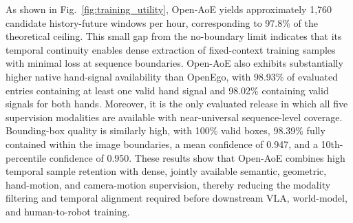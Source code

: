 As shown in Fig.~\ref{fig:training_utility}, Open-AoE yields approximately 1,760 candidate history-future windows per hour, corresponding to 97.8\% of the theoretical ceiling. %
This small gap from the no-boundary limit indicates that its temporal continuity enables dense extraction of fixed-context training samples with minimal loss at sequence boundaries. %
Open-AoE also exhibits substantially higher native hand-signal availability than OpenEgo, with 98.93\% of evaluated entries containing at least one valid hand signal and 98.02\% containing valid signals for both hands. %
Moreover, it is the only evaluated release in which all five supervision modalities are available with near-universal sequence-level coverage. %
Bounding-box quality is similarly high, with 100\% valid boxes, 98.39\% fully contained within the image boundaries, a mean confidence of 0.947, and a 10th-percentile confidence of 0.950. %
These results show that Open-AoE combines high temporal sample retention with dense, jointly available semantic, geometric, hand-motion, and camera-motion supervision, thereby reducing the modality filtering and temporal alignment required before downstream VLA, world-model, and human-to-robot training.
